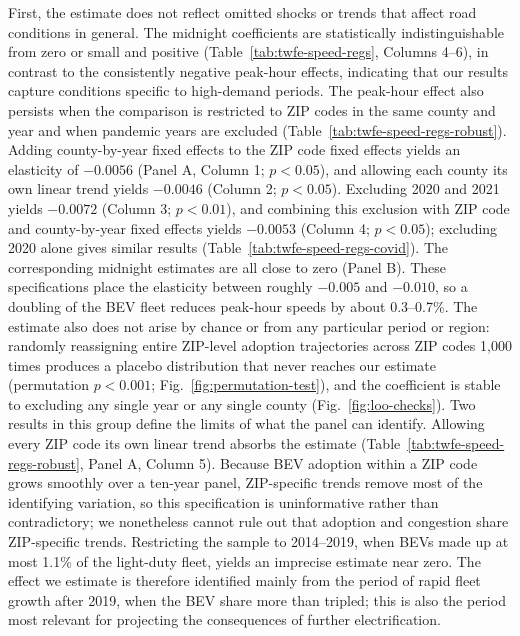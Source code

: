\documentclass[11pt, letterpaper]{article}
\begin{document}
First, the estimate does not reflect omitted shocks or trends that affect road conditions in general.
The midnight coefficients are statistically indistinguishable from zero or small and positive (Table~\ref{tab:twfe-speed-regs}, Columns 4--6), in contrast to the consistently negative peak-hour effects, indicating that our results capture conditions specific to high-demand periods.
The peak-hour effect also persists when the comparison is restricted to ZIP codes in the same county and year and when pandemic years are excluded (Table~\ref{tab:twfe-speed-regs-robust}).
Adding county-by-year fixed effects to the ZIP code fixed effects yields an elasticity of $-0.0056$ (Panel A, Column 1; $p<0.05$), and allowing each county its own linear trend yields $-0.0046$ (Column 2; $p<0.05$).
Excluding 2020 and 2021 yields $-0.0072$ (Column 3; $p<0.01$), and combining this exclusion with ZIP code and county-by-year fixed effects yields $-0.0053$ (Column 4; $p<0.05$); excluding 2020 alone gives similar results (Table~\ref{tab:twfe-speed-regs-covid}).
The corresponding midnight estimates are all close to zero (Panel B).
These specifications place the elasticity between roughly $-0.005$ and $-0.010$, so a doubling of the BEV fleet reduces peak-hour speeds by about 0.3--0.7\%.
The estimate also does not arise by chance or from any particular period or region: randomly reassigning entire ZIP-level adoption trajectories across ZIP codes 1,000 times produces a placebo distribution that never reaches our estimate (permutation $p<0.001$; Fig.~\ref{fig:permutation-test}), and the coefficient is stable to excluding any single year or any single county (Fig.~\ref{fig:loo-checks}).
Two results in this group define the limits of what the panel can identify.
Allowing every ZIP code its own linear trend absorbs the estimate (Table~\ref{tab:twfe-speed-regs-robust}, Panel A, Column 5).
Because BEV adoption within a ZIP code grows smoothly over a ten-year panel, ZIP-specific trends remove most of the identifying variation, so this specification is uninformative rather than contradictory; we nonetheless cannot rule out that adoption and congestion share ZIP-specific trends.
Restricting the sample to 2014--2019, when BEVs made up at most 1.1\% of the light-duty fleet, yields an imprecise estimate near zero.
The effect we estimate is therefore identified mainly from the period of rapid fleet growth after 2019, when the BEV share more than tripled; this is also the period most relevant for projecting the consequences of further electrification.
\end{document}
